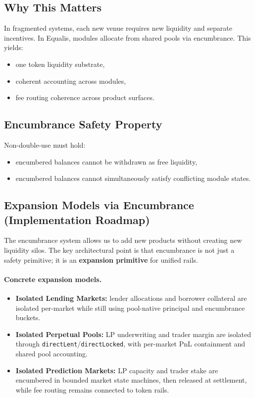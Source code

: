 \documentclass[version=preprint]{iacrcc}
\begin{document}
\subsection{Why This Matters}

In fragmented systems, each new venue requires new liquidity and separate incentives. In Equalis, modules allocate from shared pools via encumbrance. This yields:
\begin{itemize}
  \item one token liquidity substrate,
  \item coherent accounting across modules,
  \item fee routing coherence across product surfaces.
\end{itemize}

\subsection{Encumbrance Safety Property}

Non-double-use must hold:
\begin{itemize}
  \item encumbered balances cannot be withdrawn as free liquidity,
  \item encumbered balances cannot simultaneously satisfy conflicting module states.
\end{itemize}

\subsection{Expansion Models via Encumbrance (Implementation Roadmap)}

The encumbrance system allows us to add new products without creating new liquidity silos. The key architectural point is that encumbrance is not just a safety primitive; it is an \textbf{expansion primitive} for unified rails.

\paragraph{Concrete expansion models.}
\begin{itemize}
  \item \textbf {Isolated Lending Markets:} lender allocations and borrower collateral are isolated per-market while still using pool-native principal and encumbrance buckets.
  \item \textbf{Isolated Perpetual Pools:} LP underwriting and trader margin are isolated through \texttt{directLent}/\texttt{directLocked}, with per-market PnL containment and shared pool accounting.
  \item \textbf{Isolated Prediction Markets:} LP capacity and trader stake are encumbered in bounded market state machines, then released at settlement, while fee routing remains connected to token rails.
\end{itemize}
\end{document}
